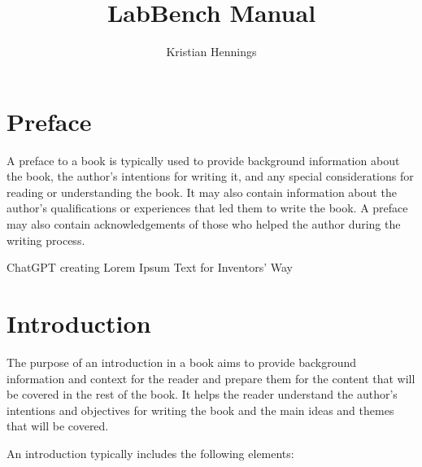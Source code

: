 \documentclass[12pt, twoside, a4paper]{book}
\begin{document}
\title{LabBench Manual}
\author{Kristian Hennings}

\maketitle

\tableofcontents

\chapter{Preface}

A preface to a book is typically used to provide background information about the book, the author's intentions for writing it, and any special considerations for reading or understanding the book. It may also contain information about the author's qualifications or experiences that led them to write the book. A preface may also contain acknowledgements of those who helped the author during the writing process.

ChatGPT creating Lorem Ipsum Text for Inventors' Way

\chapter{Introduction}

The purpose of an introduction in a book aims to provide background information and context for the reader and prepare them for the content that will be covered in the rest of the book. It helps the reader understand the author's intentions and objectives for writing the book and the main ideas and themes that will be covered.

An introduction typically includes the following elements:
\end{document}
